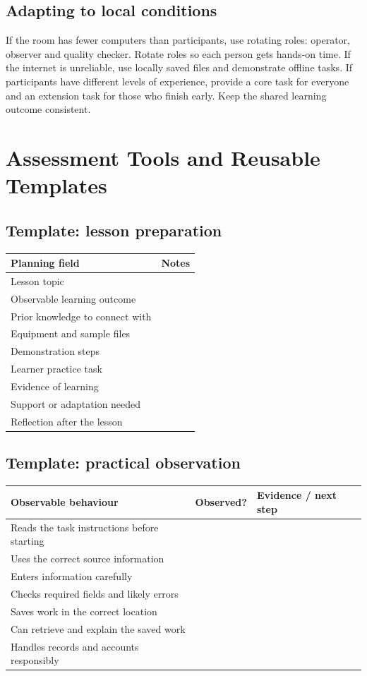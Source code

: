 \documentclass[11pt,openany,oneside]{book}
\begin{document}
\section{Adapting to local conditions}
If the room has fewer computers than participants, use rotating roles: operator, observer and quality checker. Rotate roles so each person gets hands-on time. If the internet is unreliable, use locally saved files and demonstrate offline tasks. If participants have different levels of experience, provide a core task for everyone and an extension task for those who finish early. Keep the shared learning outcome consistent.

\chapter{Assessment Tools and Reusable Templates}
\section{Template: lesson preparation}
\begin{longtable}{p{}p{}}
\toprule\textbf{Planning field} & \textbf{Notes}\\\midrule
Lesson topic & \\ [12mm]\hline
Observable learning outcome & \\ [15mm]\hline
Prior knowledge to connect with & \\ [12mm]\hline
Equipment and sample files & \\ [12mm]\hline
Demonstration steps & \\ [18mm]\hline
Learner practice task & \\ [18mm]\hline
Evidence of learning & \\ [15mm]\hline
Support or adaptation needed & \\ [15mm]\hline
Reflection after the lesson & \\ [18mm]\hline
\end{longtable}
\section{Template: practical observation}
\begin{longtable}{p{}p{}p{}}
\toprule\textbf{Observable behaviour} & \textbf{Observed?} & \textbf{Evidence / next step}\\\midrule
Reads the task instructions before starting & & \\ [12mm]\hline
Uses the correct source information & & \\ [12mm]\hline
Enters information carefully & & \\ [12mm]\hline
Checks required fields and likely errors & & \\ [12mm]\hline
Saves work in the correct location & & \\ [12mm]\hline
Can retrieve and explain the saved work & & \\ [12mm]\hline
Handles records and accounts responsibly & & \\ [12mm]\hline
\end{longtable}
\end{document}
